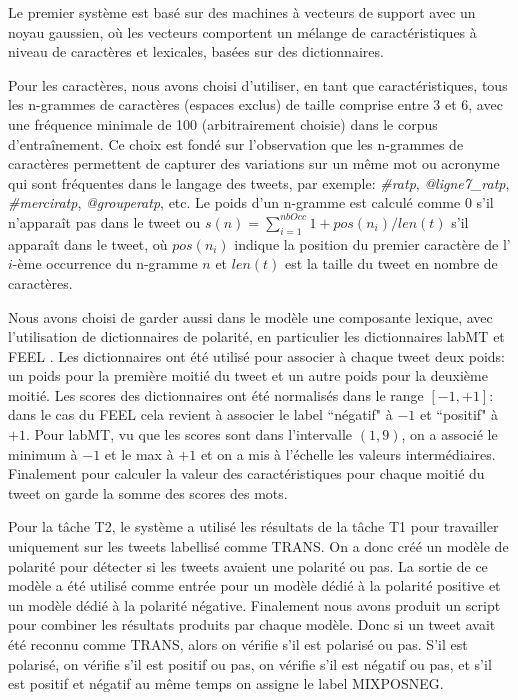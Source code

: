 Le premier système est basé sur des machines à vecteurs de support avec un noyau gaussien, où les vecteurs comportent un mélange de caractéristiques à niveau de caractères et lexicales, basées sur des dictionnaires.

Pour les caractères, nous avons choisi d'utiliser, en tant que caractéristiques, tous les n-grammes de caractères (espaces exclus) de taille comprise entre 3 et 6, avec une fréquence minimale de 100 (arbitrairement choisie) dans le corpus d’entraînement. Ce choix est fondé sur l'observation que les n-grammes
de caractères permettent de capturer des variations sur un même mot ou acronyme qui sont fréquentes dans le langage des tweets, par exemple: \emph{\#ratp}, \emph{@ligne7\_ratp}, \emph{\#merciratp}, \emph{@grouperatp}, etc. Le poids d'un n-gramme est calculé comme 0 s'il n'apparaît pas dans le tweet ou $s(n)= \sum_{i=1}^{nbOcc} 1 + pos(n_i)/len(t)$ s'il apparaît dans le tweet, où $pos(n_i)$ indique la position du premier caractère de l'$i$-ème occurrence du n-gramme $n$ et $len(t)$ est la taille du tweet en nombre de caractères.

Nous avons choisi de garder aussi dans le modèle une composante lexique, avec l'utilisation de dictionnaires de polarité, en particulier les dictionnaires labMT \cite{dodds2011} et FEEL \cite{abdaoui2017}. Les dictionnaires ont été utilisé pour associer à chaque tweet deux poids: un poids pour la première moitié du tweet et un autre poids pour la deuxième moitié. Les scores des dictionnaires ont été normalisés dans le range $[-1, +1]$: dans le cas du FEEL cela revient à associer le label ``négatif" à $-1$ et ``positif" à $+1$. 
Pour labMT, vu que les scores sont dans l'intervalle $(1,9)$, on a associé le minimum à $-1$ et le max à $+1$ et on a mis à l'échelle les valeurs intermédiaires. Finalement pour calculer la valeur des caractéristiques pour chaque moitié du tweet on garde la somme des scores des mots.

Pour la tâche T2, le système a utilisé les résultats de la tâche T1 pour travailler uniquement sur les tweets labellisé comme TRANS. On a donc créé un modèle de polarité pour détecter si les tweets avaient une polarité ou pas. La sortie de ce modèle a été utilisé comme entrée pour un modèle dédié à la polarité positive et un modèle dédié à la polarité négative. Finalement nous avons produit un script pour combiner les résultats produits par chaque modèle. Donc si un tweet avait été reconnu comme TRANS, alors on vérifie s'il est polarisé ou pas. S'il est polarisé, on vérifie s'il est positif ou pas, on vérifie s'il est négatif ou pas, et s'il est positif et négatif au même temps on assigne le label MIXPOSNEG.
